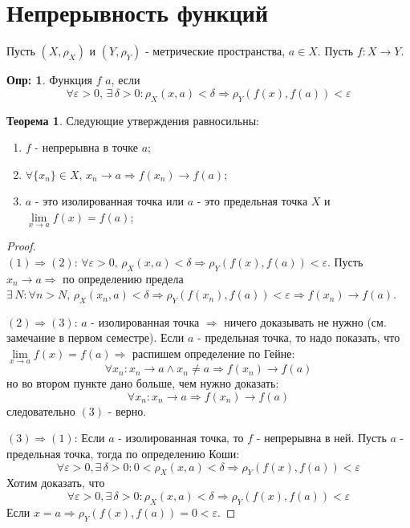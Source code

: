 \documentclass[12pt]{article}
\newcommand{\VE}{\varepsilon}
\theoremstyle{definition}
\newtheorem{defn}{Опр:}
\newtheorem{theorem}{Теорема}
\begin{document}
\newpage
\section*{Непрерывность функций}
Пусть $(X,\rho_X)$ и $(Y,\rho_Y)$ - метрические пространства, $a \in X$. Пусть $f\colon X \to Y$.
\begin{defn}
	Функция $f$  $a$, если
	$$
		\forall \VE > 0, \, \exists \, \delta > 0 \colon \rho_X(x,a) < \delta \Rightarrow \rho_Y(f(x),f(a)) < \VE
	$$
\end{defn}
\begin{theorem}
	Следующие утверждения равносильны:
	\begin{enumerate}[label ={(\arabic*)}]
		\item $f$ - непрерывна в точке $a$;
		\item $\forall \{x_n\} \in X,\,  x_n \to a \Rightarrow f(x_n) \to f(a)$;
		\item $a$ - это изолированная точка или $a$ - это предельная точка $X$ и $\lim\limits_{x \to a} f(x) = f(a)$;
	\end{enumerate}
\end{theorem}
\begin{proof}\hfill\\
	$(1) \Rightarrow (2)$: $\forall \varepsilon > 0,\, \rho_X(x,a) < \delta \Rightarrow \rho_Y(f(x),f(a)) < \varepsilon$. Пусть $x_n \to a \Rightarrow$ по определению предела $\exists \, N \colon \forall n > N, \, \rho_X(x_n,a) < \delta \Rightarrow \rho_Y(f(x_n),f(a)) < \varepsilon \Rightarrow f(x_n) \to f(a)$. 
	
	$(2) \Rightarrow (3)$: $a$ - изолированная точка $\Rightarrow$ ничего доказывать не нужно (см. замечание в первом семестре). Если $a$ - предельная точка, то надо показать, что $\lim\limits_{x \to a} f(x) = f(a) \Rightarrow$ распишем определение по Гейне:
	$$ 
		\forall x_n \colon x_n \to a \wedge x_n \neq a \Rightarrow f(x_n) \to f(a) 
	$$
	но во втором пункте дано больше, чем нужно доказать:
	$$ 
		\forall x_n \colon x_n \to a \Rightarrow f(x_n) \to f(a) 
	$$
	следовательно $(3)$ - верно.
	
	$(3) \Rightarrow (1)$: Если $a$ - изолированная точка, то $f$ - непрерывна в ней. Пусть $a$ - предельная точка, тогда по определению Коши: 
	$$
		\forall \varepsilon >0, \exists \, \delta > 0 \colon 0 <\rho_X(x,a) < \delta \Rightarrow \rho_Y(f(x),f(a)) < \varepsilon
	$$ 
	Хотим доказать, что  
	$$
		\forall \varepsilon >0, \exists \, \delta > 0 \colon \rho_X(x,a) < \delta \Rightarrow \rho_Y(f(x),f(a)) < \VE
	$$ 
	Если $x = a \Rightarrow \rho_Y(f(x),f(a)) = 0 < \varepsilon$.
\end{proof}
\end{document}

